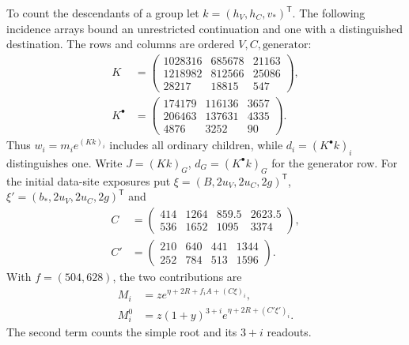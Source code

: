 \documentclass[10pt,twocolumn]{article}
\theoremstyle{definition}
\begin{document}
To count the descendants of a group let $k=(h_V,h_C,v_*)^{\mathsf T}$.
The following incidence arrays bound an unrestricted continuation
and one with a distinguished destination. The rows and columns are
ordered $V,C,\text{generator}$:
\[
\begin{aligned}
 K&=\begin{pmatrix}1028316&685678&21163\\
 1218982&812566&25086\\28217&18815&547\end{pmatrix},\\
 K^\bullet&=\begin{pmatrix}174179&116136&3657\\
 206463&137631&4335\\4876&3252&90\end{pmatrix}.
\end{aligned}
\]
Thus $w_i=m_i e^{(Kk)_i}$ includes all ordinary children, while
$d_i=(K^\bullet k)_i$ distinguishes one. Write $J=(Kk)_G$,
$d_G=(K^\bullet k)_G$ for the generator row. For the initial
data-site exposures put $\xi=(B,2u_V,2u_C,2g)^{\mathsf T}$,
$\xi'=(b_*,2u_V,2u_C,2g)^{\mathsf T}$ and
\[
\begin{aligned}
 C&=\begin{pmatrix}414&1264&859.5&2623.5\\536&1652&1095&3374\end{pmatrix},\\
 C'&=\begin{pmatrix}210&640&441&1344\\252&784&513&1596\end{pmatrix}.
\end{aligned}
\]
With $f=(504,628)$, the two contributions are
\[
\begin{aligned}
 M_i&=z e^{\eta+2R+f_i A+(C\xi)_i},\\
 M_i^0&=z(1+y)^{3+i}e^{\eta+2R+(C'\xi')_i}.
\end{aligned}
\]
The second term counts the simple root and its $3+i$ readouts.
\end{document}
